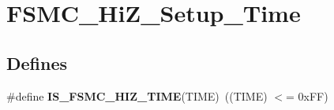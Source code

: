 \hypertarget{group__FSMC__HiZ__Setup__Time}{
\section{FSMC\_\-HiZ\_\-Setup\_\-Time}
\label{group__FSMC__HiZ__Setup__Time}
}
\subsection*{Defines}
\begin{DoxyCompactItemize}
\item 
\hypertarget{group__FSMC__HiZ__Setup__Time_gaeb6295e8cc1a524f060c5e780f868033}{
\#define {\bfseries IS\_\-FSMC\_\-HIZ\_\-TIME}(TIME)~((TIME) $<$= 0xFF)}
\label{group__FSMC__HiZ__Setup__Time_gaeb6295e8cc1a524f060c5e780f868033}

\end{DoxyCompactItemize}
